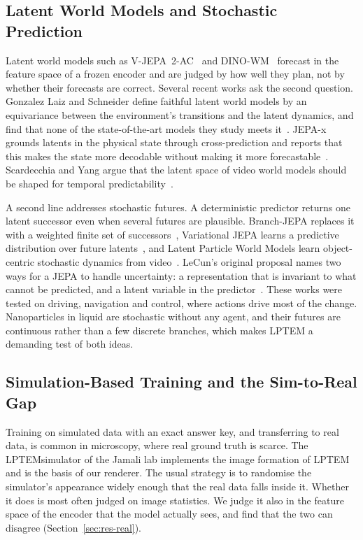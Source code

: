 \subsection{Latent World Models and Stochastic Prediction}

Latent world models such as V-JEPA~2-AC~\cite{assran2025vjepa2} and
DINO-WM~\cite{dinowm} forecast in the feature space of a frozen encoder and are judged by
how well they plan, not by whether their forecasts are correct. Several recent works ask
the second question. Gonzalez Laiz and Schneider define faithful latent world models by an
equivariance between the environment's transitions and the latent dynamics, and find that
none of the state-of-the-art models they study meets it~\cite{gonzalezlaiz2026limits}.
JEPA-x grounds latents in the physical state through cross-prediction and reports that
this makes the state more decodable without making it more forecastable~\cite{jepax}.
Scardecchia and Yang argue that the latent space of video world models should be shaped
for temporal predictability~\cite{scardecchia2026predictable}.

A second line addresses stochastic futures. A deterministic predictor returns one latent
successor even when several futures are plausible. Branch-JEPA replaces it with a weighted
finite set of successors~\cite{branchjepa}, Variational JEPA learns a predictive
distribution over future latents~\cite{vjepa_variational}, and Latent Particle World Models
learn object-centric stochastic dynamics from video~\cite{lpwm}. LeCun's original proposal
names two ways for a JEPA to handle uncertainty: a representation that is invariant to
what cannot be predicted, and a latent variable in the predictor~\cite{lecun2022path}.
These works were tested on driving, navigation and control, where actions drive most of
the change. Nanoparticles in liquid are stochastic without any agent, and their futures
are continuous rather than a few discrete branches, which makes LPTEM a demanding test
of both ideas.

\subsection{Simulation-Based Training and the Sim-to-Real Gap}

Training on simulated data with an exact answer key, and transferring to real data, is
common in microscopy, where real ground truth is scarce. The LPTEMsimulator of the Jamali
lab implements the image formation of LPTEM~\cite{lptemsim} and is the basis of our
renderer. The usual strategy is to randomise the
simulator's appearance widely enough that the real data falls inside it. Whether it does
is most often judged on image statistics. We judge it also in the feature space of the
encoder that the model actually sees, and find that the two can disagree
(Section~\ref{sec:res-real}).
